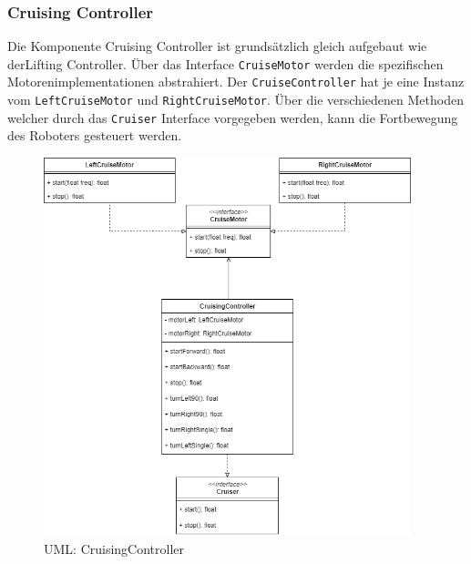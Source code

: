 \subsubsection{Cruising Controller}
Die Komponente Cruising Controller ist grundsätzlich gleich aufgebaut wie derLifting Controller. Über das Interface \texttt{CruiseMotor} werden die spezifischen Motorenimplementationen abstrahiert. Der \texttt{CruiseController} hat je eine Instanz vom \texttt{LeftCruiseMotor} und \texttt{RightCruiseMotor}. Über die verschiedenen Methoden welcher durch das \texttt{Cruiser} Interface vorgegeben werden, kann die Fortbewegung des Roboters gesteuert werden.
\begin{figure}[H]
  \includegraphics[width=0.95\textwidth]{img/softwarearchitektur/UML-CruisingController.png}
  \centering
  \caption{UML: CruisingController}
  \label{fig:uml-cruising-controller}
\end{figure}

